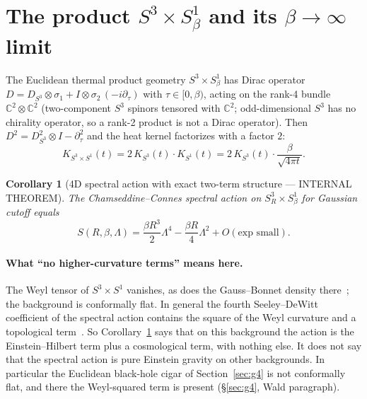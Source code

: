 \documentclass[11pt,a4paper]{article}
\theoremstyle{plain}
\newtheorem{corollary}[theorem]{Corollary}
\theoremstyle{definition}
\newcommand{\sthree}{S^{3}}
\renewcommand{\_}{\textunderscore\allowbreak}
\begin{document}
\section{The product $\sthree \times S^{1}_{\beta}$ and its $\beta \to \infty$ limit}
\label{sec:g2}

The Euclidean thermal product geometry $\sthree \times S^{1}_{\beta}$
has Dirac operator $D = D_{\sthree} \otimes \sigma_1 + I \otimes
\sigma_2\,(-i \partial_\tau)$ with $\tau \in [0, \beta)$, acting on
the rank-4 bundle $\mathbb{C}^2 \otimes \mathbb{C}^2$ (two-component
$\sthree$ spinors tensored with $\mathbb{C}^2$; odd-dimensional
$\sthree$ has no chirality operator, so a rank-2 product is not a
Dirac operator). Then $D^2 = D_{\sthree}^2 \otimes I - \partial_\tau^2$
and the heat kernel factorizes with a factor $2$:
\begin{equation}
  K_{\sthree \times S^1}(t) = 2\,K_{\sthree}(t) \cdot K_{S^1}(t)
                            = 2\,K_{\sthree}(t) \cdot \frac{\beta}{\sqrt{4\pi t}}.
\end{equation}

\begin{corollary}[4D spectral action with exact two-term structure ---
INTERNAL THEOREM]
\label{cor:zeta_4D_neg_k}
The Chamseddine--Connes spectral action on $\sthree_R \times S^1_\beta$
for Gaussian cutoff equals
\begin{equation}
  S(R, \beta, \Lambda) = \frac{\beta R^3}{2} \Lambda^4
                       - \frac{\beta R}{4} \Lambda^2
                       + O(\text{exp small}).
  \label{eq:4D_action}
\end{equation}
\end{corollary}

\paragraph{What ``no higher-curvature terms'' means here.} The Weyl tensor
of $\sthree \times S^1$ vanishes, as does the Gauss--Bonnet density
there~\cite{chamseddine_connes2008_uncanny}; the background is conformally
flat. In general the fourth Seeley--DeWitt coefficient of the spectral
action contains the square of the Weyl curvature and a topological
term~\cite{chamseddine_connes2008_uncanny}. So
Corollary~\ref{cor:zeta_4D_neg_k} says that on this background the action
is the Einstein--Hilbert term plus a cosmological term, with nothing else.
It does not say that the spectral action is pure Einstein gravity on other
backgrounds. In particular the Euclidean black-hole cigar of
Section~\ref{sec:g4} is not conformally flat, and there the Weyl-squared
term is present (\S\ref{sec:g4}, Wald paragraph).
\end{document}

